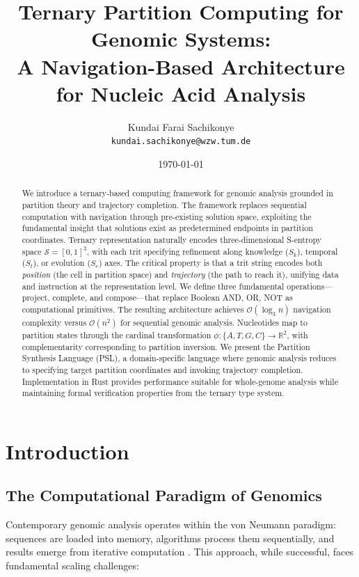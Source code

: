 \documentclass[twocolumn,10pt]{article}
\title{\textbf{Ternary Partition Computing for Genomic Systems:\\A Navigation-Based Architecture for Nucleic Acid Analysis}}
\author{
Kundai Farai Sachikonye\\
\texttt{kundai.sachikonye@wzw.tum.de}
}
\date{\today}
\theoremstyle{remark}
\newcommand{\Sk}{S_k}
\newcommand{\St}{S_t}
\newcommand{\Se}{S_e}
\newcommand{\Sspace}{\mathcal{S}}
\newcommand{\bigO}{\mathcal{O}}
\begin{document}
\maketitle

\begin{abstract}
We introduce a ternary-based computing framework for genomic analysis grounded in partition theory and trajectory completion. The framework replaces sequential computation with navigation through pre-existing solution space, exploiting the fundamental insight that solutions exist as predetermined endpoints in partition coordinates. Ternary representation naturally encodes three-dimensional S-entropy space $\Sspace = [0,1]^3$, with each trit specifying refinement along knowledge ($\Sk$), temporal ($\St$), or evolution ($\Se$) axes. The critical property is that a trit string encodes both \textit{position} (the cell in partition space) and \textit{trajectory} (the path to reach it), unifying data and instruction at the representation level. We define three fundamental operations---project, complete, and compose---that replace Boolean AND, OR, NOT as computational primitives. The resulting architecture achieves $\bigO(\log_3 n)$ navigation complexity versus $\bigO(n^2)$ for sequential genomic analysis. Nucleotides map to partition states through the cardinal transformation $\phi: \{A,T,G,C\} \to \mathbb{R}^2$, with complementarity corresponding to partition inversion. We present the Partition Synthesis Language (PSL), a domain-specific language where genomic analysis reduces to specifying target partition coordinates and invoking trajectory completion. Implementation in Rust provides performance suitable for whole-genome analysis while maintaining formal verification properties from the ternary type system.
\end{abstract}

\section{Introduction}

\subsection{The Computational Paradigm of Genomics}

Contemporary genomic analysis operates within the von Neumann paradigm: sequences are loaded into memory, algorithms process them sequentially, and results emerge from iterative computation \citep{altschul1990basic, needleman1970general}. This approach, while successful, faces fundamental scaling challenges:
\end{document}
